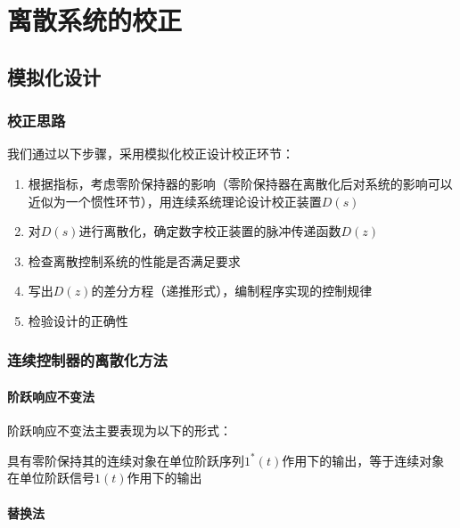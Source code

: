 \chapter{离散系统的校正}

\section{模拟化设计}

\subsection{校正思路}

我们通过以下步骤，采用模拟化校正设计校正环节：
\begin{enumerate}
    \item 根据指标，考虑零阶保持器的影响（零阶保持器在离散化后对系统的影响可以近似为一个惯性环节），用连续系统理论设计校正装置$D(s)$
    \item 对$D(s)$进行离散化，确定数字校正装置的脉冲传递函数$D(z)$
    \item 检查离散控制系统的性能是否满足要求
    \item 写出$D(z)$的差分方程（递推形式），编制程序实现的控制规律
    \item 检验设计的正确性
\end{enumerate}

\subsection{连续控制器的离散化方法}

\subsubsection{阶跃响应不变法}

阶跃响应不变法主要表现为以下的形式：

具有零阶保持其的连续对象在单位阶跃序列$1^{*}(t)$作用下的输出，等于连续对象在单位阶跃信号$1(t)$作用下的输出

\subsubsection{替换法}

